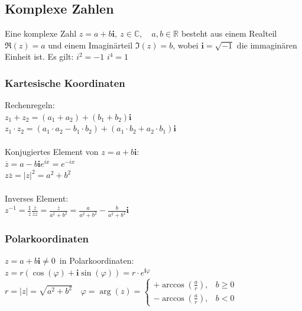 \documentclass[6pt,a4paper]{scrartcl}
\begin{document}
\begin{multicols*}{4}
\subsection{Komplexe Zahlen}
Eine komplexe Zahl $z=a+b\mathbf{i},\ z\in \mathbb C, \quad a,b \in \mathbb R$ besteht aus einem Realteil $\Re(z)=a$ und einem Imaginärteil $\Im(z)=b$, wobei $\mathbf{i}=\sqrt{-1}$ die immaginären Einheit ist.
Es gilt: \quad $i^2 = -1$ \quad $i^4 = 1$
\subsubsection{Kartesische Koordinaten}
Rechenregeln:\\
$z_1+z_2=(a_1+a_2)+(b_1+b_2)\mathbf{i}$\\
$z_1\cdot z_2=(a_1\cdot a_2-b_1\cdot b_2)+(a_1\cdot b_2+a_2\cdot b_1)\mathbf{i}$\\
\\
Konjugiertes Element von $z=a+b\mathbf{i}$:\\
$\overline{z}=a-b\mathbf{i}$\qquad \qquad \qquad \qquad \qquad \qquad \qquad \qquad $e^{\overline{ix}} = e^{-ix}$  \\
$z\overline{z}=|z|^2=a^2+b^2$\\
\\
Inverses Element:\\
$z^{-1}=\frac{1}{z}\frac{\overline z}{\overline z z}=\frac{\overline z}{a^2+b^2}=\frac{a}{a^2+b^2} - \frac{b}{a^2+b^2}\mathbf{i}$


\subsubsection{Polarkoordinaten}
$z=a+b\mathbf{i}\ne0$\ in Polarkoordinaten:\\
$z=r (\cos(\varphi)+\mathbf{i}\sin(\varphi))=r\cdot e^{\mathbf{i} \varphi}$\\
$r=|z|=\sqrt{a^2+b^2}\quad\varphi=\arg(z)=\begin{cases}+\arccos \left( \frac{a}{r}\right),  & b\ge0   \\  -\arccos \left( \frac{a}{r}\right), & b<0\end{cases}$


\end{multicols*}
\end{document}
